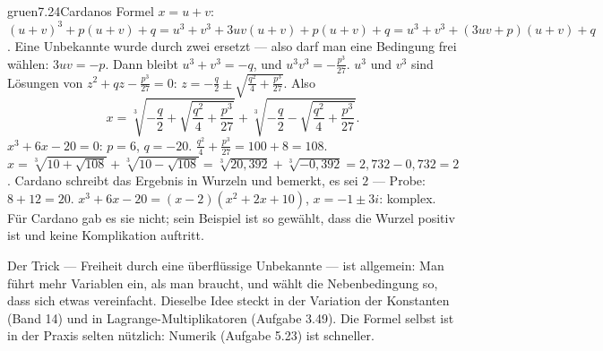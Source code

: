 \begin{loesungkarte}{gruen}{7.24}{Cardanos Formel}
$x = u + v$: $(u + v)^{3} + p(u + v) + q = u^{3} + v^{3} + 3uv(u + v) + p(u + v) + q = u^{3} + v^{3} + (3uv + p)(u + v) + q$.
Eine Unbekannte wurde durch zwei ersetzt --- also darf man eine Bedingung frei wählen: $3uv = -p$. Dann bleibt $u^{3} + v^{3} = -q$, und $u^{3}v^{3} = -\frac{p^{3}}{27}$.
$u^{3}$ und $v^{3}$ sind Lösungen von $z^{2} + qz - \frac{p^{3}}{27} = 0$: $z = -\frac q2\pm\sqrt{\frac{q^{2}}4 + \frac{p^{3}}{27}}$. Also
\[ x = \sqrt[3]{-\frac q2 + \sqrt{\frac{q^{2}}4 + \frac{p^{3}}{27}}} + \sqrt[3]{-\frac q2 - \sqrt{\frac{q^{2}}4 + \frac{p^{3}}{27}}}. \]
$x^{3} + 6x - 20 = 0$: $p = 6$, $q = -20$. $\frac{q^{2}}4 + \frac{p^{3}}{27} = 100 + 8 = 108$. $x = \sqrt[3]{10 + \sqrt{108}} + \sqrt[3]{10 - \sqrt{108}} = \sqrt[3]{20{,}392} + \sqrt[3]{-0{,}392} = 2{,}732 - 0{,}732 = 2$. Cardano schreibt das Ergebnis in Wurzeln und bemerkt, es sei $2$ --- Probe: $8 + 12 = 20$. \checkmark
{}
$x^{3} + 6x - 20 = (x - 2)(x^{2} + 2x + 10)$, $x = -1\pm3i$: komplex. Für Cardano gab es sie nicht; sein Beispiel ist so gewählt, dass die Wurzel positiv ist und keine Komplikation auftritt.
\begin{mitnehmen}\kastentext
Der Trick --- Freiheit durch eine überflüssige Unbekannte --- ist allgemein: Man führt mehr Variablen ein, als man braucht, und wählt die Nebenbedingung so, dass sich etwas vereinfacht. Dieselbe Idee steckt in der Variation der Konstanten (Band 14) und in Lagrange-Multiplikatoren (Aufgabe 3.49). Die Formel selbst ist in der Praxis selten nützlich: Numerik (Aufgabe 5.23) ist schneller.
\end{mitnehmen}
\end{loesungkarte}

